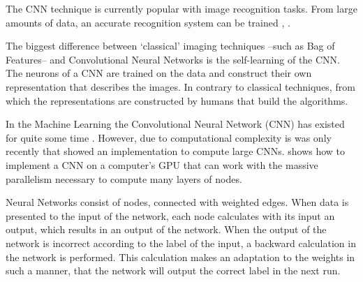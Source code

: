 The CNN technique is currently popular with image recognition tasks.
From large amounts of data, an accurate recognition system can be trained \citep{girshick2014rich}, \citep{razavian2014cnn}.

The biggest difference between `classical' imaging techniques --such as Bag of Features-- and Convolutional Neural Networks is the self-learning of the CNN.
The neurons of a CNN are trained on the data and construct their own representation that describes the images.
In contrary to classical techniques, from which the representations are constructed by humans that build the algorithms.



In the Machine Learning the Convolutional Neural Network (CNN) has existed for quite some time \citep{fukushima1980neocognition}.
However, due to computational complexity is was only recently that \citet{krizhevsky2012imagenet} showed an implementation to compute large CNNs.
\citeauthor{krizhevsky2012imagenet} shows how to implement a CNN on a computer's GPU that can work with the massive parallelism necessary to compute many layers of nodes.

Neural Networks consist of nodes, connected with weighted edges.
When data is presented to the input of the network, each node calculates with its input an output, which results in an output of the network.
When the output of the network is incorrect according to the label of the input, a backward calculation in the network is performed.
This calculation makes an adaptation to the weights in such a manner, that the network will output the correct label in the next run.

